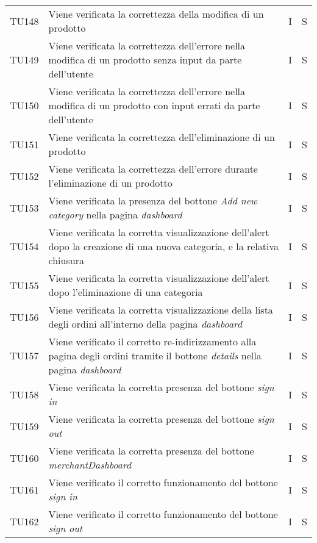 {\begin{longtable}{C{2cm} C{9.6cm} C{1.5cm} C{1cm}}
TU148 & Viene verificata la correttezza della modifica di un prodotto & I & S\\

TU149 & Viene verificata la correttezza dell'errore nella modifica di un prodotto senza input da parte dell'utente & I & S\\

TU150 & Viene verificata la correttezza dell'errore nella modifica di un prodotto con input errati da parte dell'utente & I & S\\

TU151 & Viene verificata la correttezza dell'eliminazione di un prodotto & I & S\\

TU152 & Viene verificata la correttezza dell'errore durante l'eliminazione di un prodotto & I & S\\

TU153 & Viene verificata la presenza del bottone \textit{Add new category} nella pagina \textit{dashboard} & I & S\\

TU154 & Viene verificata la corretta visualizzazione dell'alert dopo la creazione di una nuova categoria, e la relativa chiusura & I & S\\

TU155 & Viene verificata la corretta visualizzazione dell'alert dopo l'eliminazione di una categoria & I & S\\

TU156 & Viene verificata la corretta visualizzazione della lista degli ordini all'interno della pagina \textit{dashboard} & I & S\\

TU157 & Viene verificato il corretto re-indirizzamento alla pagina degli ordini tramite il bottone \textit{details} nella pagina \textit{dashboard} & I & S\\


TU158 & Viene verificata la corretta presenza del bottone \textit{sign in}& I & S\\

TU159 & Viene verificata la corretta presenza del bottone \textit{sign out} & I & S\\

TU160 & Viene verificata la corretta presenza del bottone \textit{merchantDashboard} & I & S\\

TU161 & Viene verificato il corretto funzionamento del bottone \textit{sign in} & I & S\\

TU162 & Viene verificato il corretto funzionamento del bottone \textit{sign out} & I & S\\


\end{longtable}

}


